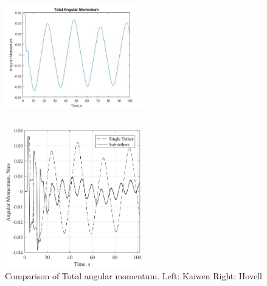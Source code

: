 \begin{figure}[htbp]
\centering
\begin{minipage}[t]{0.48\textwidth}
\centering
\includegraphics[width=6cm,height=6cm]{fig/simulation/ThrustStable/Totalangularmomentum.jpg}
\end{minipage}
\begin{minipage}[t]{0.48\textwidth}
\centering
\includegraphics[width=6cm,height=6cm]{fig/simulation/ThrustStable/Totalangularmomentumsample.jpg}
\end{minipage}
\caption{Comparison of Total angular momentum.		Left: Kaiwen	Right: Hovell}
\end{figure}
